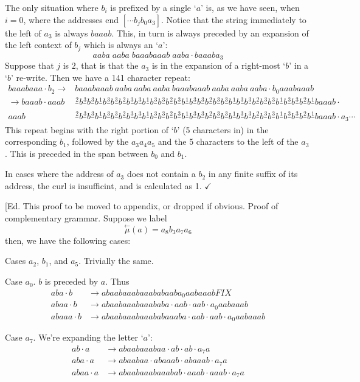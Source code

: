 \documentclass[11pt]{article}
\def\QED{$\checkmark$}
\def\ni{\noindent}
\def\s#1{\frac{#1}{}}
\def\la#1{\overset{\leftarrow}{#1}}
\def\rmu{\la{\mu}}
\def\q#1{`$#1$'}
\def\addr#1{$[#1]$}
\def\Proof{\ni{\bf Proof:} }
\begin{document}
The only situation where $b_i$ is prefixed by a single \q{a} is, as we have
seen, when $i=0$, where the addresses end \addr{\cdots b_jb_0a_3}.  Notice that the
string immediately to the left of $a_3$ is always $baaab$.  This, in turn is
always preceded by an expansion of the left context of $b_j$ which is always
an \q{a}:
$$aaba\;aaba\;baaabaaab\;aaba\cdot baaaba_3$$ Suppose that $j$ is $2$, that is
that the $a_3$ is in the expansion of a right-most \q{b} in a \q{b} re-write.
Then we have a 141 character repeat:
\begin{align*}
baaabaaa\cdot b_2\rightarrow{} & baaabaaab~aaba~aaba~aaba~baaabaaab~aaba~aaba~aaba\cdot b_0aaabaaab\\
\rightarrow baaab\cdot{}aaab&\s{2}b\s{3}b\s{3}b\s{1}b\s{3}b\s{3}b\s{2}b\s{3}b\s{3}b\s{1}b\s{3}b\s{3}b\s{2}b\s{3}b\s{1}b\s{3}b\s{3}b\s{2}b\s{3}b\s{3}b\s{1}b\s{3}b\s{3}b\s{2}b\s{3}b\s{3}b\s{1}b\s{3}b\s{3}b\s{2}b\s{1}baaab\cdot\\
  aaab&\s{2}b\s{3}b\s{3}b\s{1}b\s{3}b\s{3}b\s{2}b\s{3}b\s{3}b\s{1}b\s{3}b\s{3}b\s{2}b\s{3}b\s{1}b\s{3}b\s{3}b\s{2}b\s{3}b\s{3}b\s{1}b\s{3}b\s{3}b\s{2}b\s{3}b\s{3}b\s{1}b\s{3}b\s{3}b\s{2}b\s{1}baaab\cdot a_3\cdots
\end{align*}
\ni This repeat begins with the right portion of \q{b} (5
characters in) in the corresponding $b_1$, followed by the $a_3a_4a_5$ and the
5 characters to the left of the $a_3$.  This is preceded in the span between
$b_0$ and $b_1$.

In cases where the address of $a_3$ does not contain a $b_2$ in any finite
suffix of its address, the curl is insufficint, and is calculated as 1.
\QED

\ni{\bf Proof of Lemma~\ref{lem:abcurl}.} \ni[Ed. This proof to be moved to appendix, or dropped if obvious. \Proof Proof of complementary grammar.  Suppose we label
$$\rmu(a)=a_8b_3a_7a_6$$
\ni then, we have the following cases:

\ni Cases $a_2$, $b_1$, and $a_5$.  Trivially the same.

\ni Case $a_0$.  $b$ is preceded by $a$.  Thus
\begin{align*}
aba\cdot b&\rightarrow abaabaaabaaababaaba_0aabaaab FIX\\
abaa\cdot b&\rightarrow abaabaaabaaababa\cdot aab\cdot aab\cdot a_0aabaaab\\
abaaa\cdot b&\rightarrow abaabaaabaaababaaaba\cdot aab\cdot aab\cdot a_0aabaaab
\end{align*}

\ni Case $a_7$. We're expanding the letter \q{a}:
\begin{align*}
ab\cdot a&\rightarrow abaabaaabaa\cdot ab\cdot ab\cdot a_7a\\
aba\cdot a&\rightarrow abaabaa\cdot abaaab\cdot abaaab\cdot a_7a\\
abaa\cdot a&\rightarrow abaabaaabaaabab\cdot aaab\cdot aaab\cdot a_7a
\end{align*}
\end{document}
